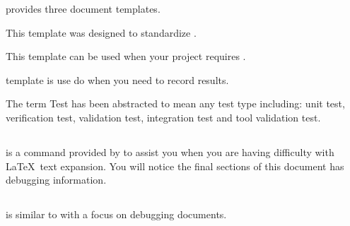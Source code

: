 \skAutoDoc provides three document templates.

\begin{description}[leftmargin=3cm, style=nextline]
  \item[\skToolTest:] This template was designed to standardize
    \skToolTestTemplate.

  \item[\skUnitTest:] This template can be used when your project requires
    \skUnitTestTemplate.

  \item[\skVerTest:] \skVerTestTemplate template is use do when you need to
    record \skUnitTestTemplate results.

\end{description}

The term Test has been abstracted to mean any test type including: unit test,
verification test, validation test, integration test and tool validation test.

\subsection{\skTlcDebug}
\skTlcDebug is a command provided by \skTlcArticle to assist you when you are
having difficulty with \LaTeX\ text expansion.  You will notice the final
sections of this document has debugging information.

\subsection{\skAutoDocDebug}
\skAutoDocDebug is similar to \skTlcDebug with a focus on debugging \skAutoDoc
documents.
